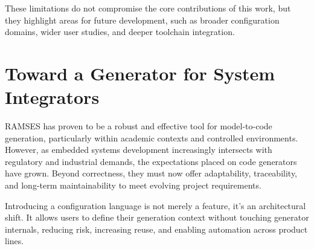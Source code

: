 These limitations do not compromise the core contributions of this work, but they highlight areas for future development, such as broader configuration domains, wider user studies, and deeper toolchain integration.


\section{Toward a Generator for System Integrators}
\label{sec:conclusion_configurable_generation}

RAMSES has proven to be a robust and effective tool for model-to-code generation, particularly within academic contexts and controlled environments. However, as embedded systems development increasingly intersects with regulatory and industrial demands, the expectations placed on code generators have grown. Beyond correctness, they must now offer adaptability, traceability, and long-term maintainability to meet evolving project requirements.

Introducing a configuration language is not merely a feature, it's an architectural shift. It allows users to define their generation context without touching generator internals, reducing risk, increasing reuse, and enabling automation across product lines.












